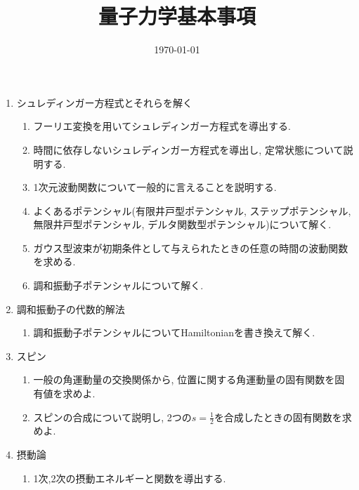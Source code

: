 \documentclass[11pt,a4paper]{jarticle}
\title{量子力学基本事項}
\author{}
\date{\today}
\begin{document}
\maketitle
\begin{enumerate}
    \item シュレディンガー方程式とそれらを解く
    \begin{enumerate}
        \item フーリエ変換を用いてシュレディンガー方程式を導出する.
        \item 時間に依存しないシュレディンガー方程式を導出し, 定常状態について説明する.
        \item 1次元波動関数について一般的に言えることを説明する.
        \item よくあるポテンシャル(有限井戸型ポテンシャル, ステップポテンシャル, 無限井戸型ポテンシャル, デルタ関数型ポテンシャル)について解く.
        \item ガウス型波束が初期条件として与えられたときの任意の時間の波動関数を求める.
        \item 調和振動子ポテンシャルについて解く.
    \end{enumerate}
    \item 調和振動子の代数的解法
    \begin{enumerate}
        \item 調和振動子ポテンシャルについてHamiltonianを書き換えて解く.
    \end{enumerate}
    \item スピン
    \begin{enumerate}
        \item 一般の角運動量の交換関係から, 位置に関する角運動量の固有関数を固有値を求めよ.
        \item スピンの合成について説明し, 2つの$s=\frac{1}{2}$を合成したときの固有関数を求めよ.
    \end{enumerate}
    \item 摂動論
    \begin{enumerate}
        \item 1次,2次の摂動エネルギーと関数を導出する.
    \end{enumerate}
\end{enumerate}
\end{document}
